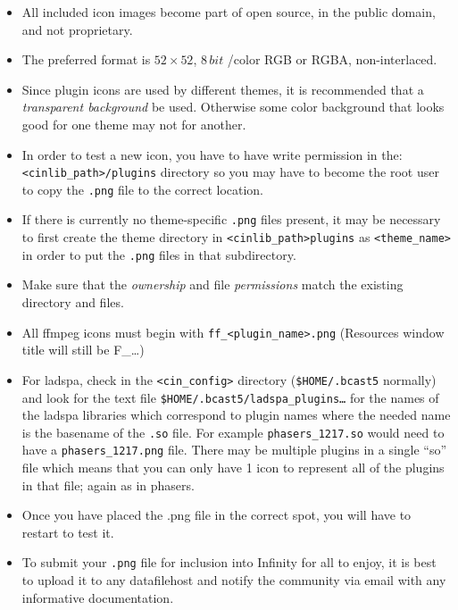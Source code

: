 \begin{itemize}
    \item All included icon images become part of open source, in the public domain, and not proprietary.
    \item The preferred format is $52 \times 52$, $8\,bit$ /color RGB or RGBA, non-interlaced.
    \item Since plugin icons are used by different themes, it is recommended that a \textit{transparent background} be used. Otherwise some color background that looks good for one theme may not for another.
    \item In order to test a new icon, you have to have write permission in the: \\
    \texttt{<cinlib\_path>/plugins} directory so you may have to become the root user to copy the \texttt{.png} file to the correct location.
    \item If there is currently no theme-specific \texttt{.png} files present, it may be necessary to first create the theme directory in \texttt{<cinlib\_path>plugins} as \texttt{<theme\_name>} in order to put the \texttt{.png} files in that subdirectory.
    \item Make sure that the \textit{ownership} and file \textit{permissions} match the existing directory and files.
    \item All ffmpeg icons must begin with \texttt{ff\_<plugin\_name>.png} (Resources window title will still be F\_\dots)
    \item For ladspa, check in the \texttt{<cin\_config>} directory (\texttt{\$HOME/.bcast5} normally) and look for the text file \texttt{\$HOME/.bcast5/ladspa\_plugins\dots} for the names of the ladspa libraries which correspond to plugin names where the needed name is the basename of the \texttt{.so} file.
        For example \texttt{pha\-sers\_1217.so} would need to have a \texttt{phasers\_1217.png} file. There may be multiple plugins in a single “so” file which means that you can only have 1 icon to represent all of the plugins in that file; again as in phasers.
    \item Once you have placed the .png file in the correct spot, you will have to restart \CGG{} to test it.
    \item To submit your \texttt{.png} file for inclusion into \CGG{} Infinity for all to enjoy, it is best to upload it to any datafilehost and notify the community via email with any informative documentation.
\end{itemize}

